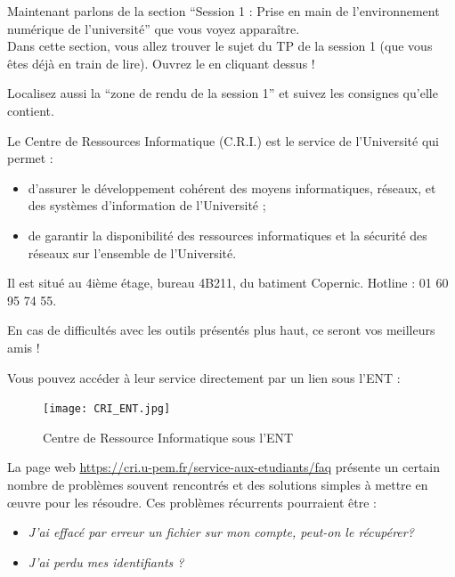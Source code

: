\documentclass{article}
\begin{document}
\begin{exercice}
\medskip

Maintenant parlons de la section ``Session 1 : Prise en main de l’environnement numérique de l’université'' que vous voyez apparaître.\\
Dans cette section, vous allez trouver le sujet du TP de la session 1 (que vous êtes déjà en train de lire). Ouvrez le en cliquant dessus !   

Localisez aussi la ``zone de rendu de la session 1'' et suivez les consignes qu'elle contient.

\end{exercice}

\begin{exercice}
Le Centre de Ressources Informatique (C.R.I.) est le service de l'Université qui permet :

\begin{itemize}
\item d'assurer le développement cohérent des moyens informatiques,   réseaux,   et des systèmes
d’information de l'Université ;

\medskip

\item de garantir la disponibilité des ressources informatiques et la sécurité des réseaux 
sur l'ensemble de l'Université.
\end{itemize}

Il est situé au 4ième étage, bureau 4B211, du batiment Copernic. Hotline : 01 60 95 74 55.

\medskip

En cas de difficultés avec les outils présentés plus haut, ce seront vos meilleurs amis !

\medskip

Vous pouvez accéder à leur service directement par un lien sous l'ENT : 

\begin{figure}[h!]
    \begin{center}
    \texttt{[image: CRI\_ENT.jpg]}
    \caption{Centre de Ressource Informatique sous l'ENT}
     \end{center}
\end{figure}    

La page web \url{https://cri.u-pem.fr/service-aux-etudiants/faq}
présente un certain nombre de problèmes souvent rencontrés et des solutions simples à mettre
en œuvre pour les résoudre. Ces problèmes récurrents pourraient être :
\begin{itemize}
\item \emph{J'ai effacé par erreur un fichier sur mon compte,   peut-on le récupérer?}

\item \emph{J'ai perdu mes identifiants ?}
\end{itemize}

\end{exercice}
\end{document}
